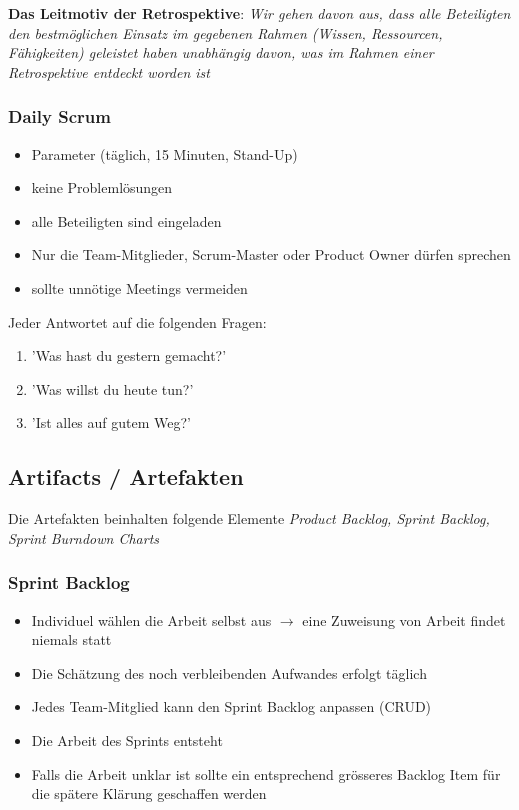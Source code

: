 \documentclass{report}
\theoremstyle{definition}
\theoremstyle{example}
\begin{document}
\textbf{Das Leitmotiv der Retrospektive}: \textit{Wir gehen davon aus, dass alle Beteiligten den bestmöglichen Einsatz im gegebenen Rahmen (Wissen, Ressourcen, Fähigkeiten) geleistet haben unabhängig davon, was im Rahmen einer Retrospektive entdeckt worden ist}

\subsubsection{Daily Scrum}
\begin{itemize}
	\item Parameter (täglich, 15 Minuten, Stand-Up)
	\item keine Problemlösungen
	\item alle Beteiligten sind eingeladen
	\item Nur die Team-Mitglieder, Scrum-Master oder Product Owner dürfen sprechen
	\item sollte unnötige Meetings vermeiden
\end{itemize}

Jeder Antwortet auf die folgenden Fragen:
\begin{enumerate}
	\item 'Was hast du gestern gemacht?'
	\item 'Was willst du heute tun?'
	\item 'Ist alles auf gutem Weg?'
\end{enumerate}

\subsection{Artifacts / Artefakten}
Die Artefakten beinhalten folgende Elemente \textit{Product Backlog, Sprint Backlog, Sprint Burndown Charts}

\subsubsection{Sprint Backlog}
\begin{itemize}
	\item Individuel wählen die Arbeit selbst aus $\rightarrow$ eine Zuweisung von Arbeit findet niemals statt
	\item Die Schätzung des noch verbleibenden Aufwandes erfolgt täglich
	\item Jedes Team-Mitglied kann den Sprint Backlog anpassen (CRUD)
	\item Die Arbeit des Sprints entsteht
	\item Falls die Arbeit unklar ist sollte ein entsprechend grösseres Backlog Item für die spätere Klärung geschaffen werden
\end{itemize}
\end{document}
